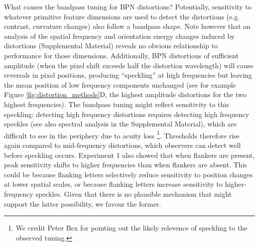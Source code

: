 \documentclass[doc, 11pt,a4paper,natbib]{apa6}\usepackage[]{graphicx}\usepackage[]{color}
\begin{document}
What causes the bandpass tuning for BPN distortions?
Potentially, sensitivity to whatever primitive feature dimensions are used to detect the distortions (e.g. contrast, curvature changes) also follow a bandpass shape.
Note however that an analysis of the spatial frequency and orientation energy changes induced by distortions (Supplemental Material) reveals no obvious relationship to performance for those dimensions.
Additionally, BPN distortions of sufficient amplitude (when the pixel shift exceeds half the distortion wavelength) will cause reversals in pixel positions, producing ``speckling'' at high frequencies but leaving the mean position of low frequency components unchanged (see for example Figure \ref{fig:distortion_methods}D, the highest amplitude distortions for the two highest frequencies).
The bandpass tuning might reflect sensitivity to this speckling: detecting high frequency distortions requires detecting high frequency speckles (see also spectral analysis in the Supplemental Material), which are difficult to see in the periphery due to acuity loss \footnote{We credit Peter Bex for pointing out the likely relevence of speckling to the observed tuning.}.
Thresholds therefore rise again compared to mid-frequency distortions, which observers can detect well before speckling occurs.
Experiment 1 also showed that when flankers are present, peak sensitivity shifts to higher frequencies than when flankers are absent.
This could be because flanking letters selectively reduce sensitivity to position changes at lower spatial scales, or because flanking letters increase sensitivity to higher-frequency speckles.
Given that there is no plausible mechanism that might support the latter possibility, we favour the former.
\end{document}
